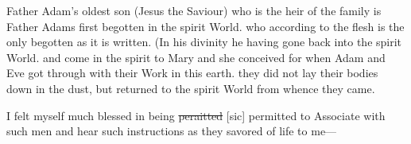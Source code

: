 					Father Adam's oldest son (Jesus the Saviour) who is the heir of the family is Father Adams first begotten in the spirit World. who according to the flesh is the only begotten as it is written. (In his divinity he having gone back into the spirit World. and come in the spirit to Mary and she conceived for when Adam and Eve got through with their Work in this earth. they did not lay their bodies down in the dust, but returned to the spirit World from whence they came.
					
					I felt myself much blessed in being \sout{peraitted} [sic] permitted to Associate with such men and hear such instructions as they savored of life to me---
